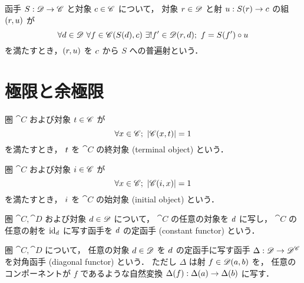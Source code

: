 \documentclass[titlepage]{ltjsreport}
\newtheorem[S]{theorem}{定理}[chapter]
\newtheorem[S]{definition}[theorem]{定義}
\newtheorem[S]{example}[theorem]{例}
\begin{document}
\begin{definition}[普遍射-2]
  \def\c{\obj{c}}%
  \def\d{\obj{d}}%
  \def\r{\obj{r}}%
  函手 ${S}:{\mathscr{D}}\to{\mathscr{C}}$ と対象 $\c\in\objs{\cat{C}}$ について，
  対象 $\r\in\objs{\cat{D}}$ と射 $\mrp{u}{S(r)}{\c}$ の組 $(\r,u)$ が
  \begin{equation}
    \forall\d\in\objs{\cat{D}}\ \forall f\in\mrps{\cat{C}}{S(d)}{\c}
    \ \exists!f'\in\mrps{\cat{D}}{\r}{\d};\ f=S(f')\circ u
  \end{equation}
  を満たすとき，$(\r,u)$ を $\c$ から $S$ への普遍射という．
\end{definition}

\section{極限と余極限}

\begin{definition}[終対象]
  圏 $\cat{C}$ および対象 $\obj{t}\in\objs{\cat{C}}$ が
  \begin{equation}
    \forall\obj{x}\in\objs{\cat{C}};\ |\mrps{\cat{C}}{\obj{x}}{\obj{t}}|=1
  \end{equation}
  を満たすとき，
  $\obj{t}$ を $\cat{C}$ の終対象 (terminal object) という．
\end{definition}

\begin{definition}[始対象]
  圏 $\cat{C}$ および対象 $\obj{i}\in\objs{\cat{C}}$ が
  \begin{equation}
    \forall\obj{x}\in\objs{\cat{C}};\ |\mrps{\cat{C}}{\obj{i}}{\obj{x}}|=1
  \end{equation}
  を満たすとき，
  $\obj{i}$ を $\cat{C}$ の始対象 (initial object) という．
\end{definition}

\begin{center}
  
\end{center}

\begin{definition}[定函手]
  圏 $\cat{C},\cat{D}$ および対象 $\obj{d}\in\objs{\cat{D}}$ について，
  $\cat{C}$ の任意の対象を $\obj{d}$ に写し，
  $\cat{C}$ の任意の射を $\id{\obj{d}}$ に写す函手を
  $\obj{d}$ の定函手 (constant functor) という．
\end{definition}

\begin{definition}[対角函手]
  圏 $\cat{C},\cat{D}$ について，
  任意の対象 $\obj{d}\in\objs{\cat{D}}$ を $\obj{d}$ の定函手に写す函手
  ${\Delta}:{\mathscr{D}}\to{\mathscr{D}^{\mathscr{C}}}$ を対角函手 (diagonal functor) という．
  ただし $\Delta$ は射 $f\in\mathscr{D}(a,b)$ を，
  任意のコンポーネントが $f$ であるような自然変換
  ${\Delta(f)}:{\Delta(a)}\to{\Delta(b)}$ に写す．
\end{definition}
\end{document}
